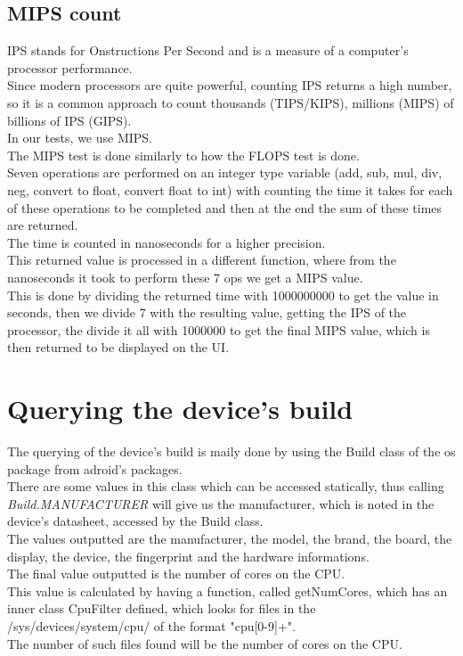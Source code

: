 \documentclass[a4paper,10pt]{report}
\begin{document}
 \subsection{MIPS count}
 IPS stands for Onstructions Per Second and is a measure of a computer's processor performance.\\
 Since modern processors are quite powerful, counting IPS returns a high number, so it is a common approach to count thousands (TIPS/KIPS), millions (MIPS) of billions of IPS (GIPS).\\
 In our tests, we use MIPS.\\
 The MIPS test is done similarly to how the FLOPS test is done. \\
 Seven operations are performed on an integer type variable (add, sub, mul, div, neg, convert to float, convert float to int) with counting the time it takes for each of these operations to be completed and then at the end the sum of these times are returned.\\
 The time is counted in nanoseconds for a higher precision.\\
 This returned value is processed in a different function, where from the nanoseconds it took to perform these 7 ops we get a MIPS value.\\
 This is done by dividing the returned time with 1000000000 to get the value in seconds, then we divide 7 with the resulting value, getting the IPS of the processor, the divide it all with 1000000 to get the final MIPS value, which is then returned to be displayed on the UI.\\
 
 \section{Querying the device's build}
 The querying of the device's build is maily done by using the Build class of the os package from adroid's packages.\\
 There are some values in this class which can be accessed statically, thus calling \textit{Build.MANUFACTURER} will give us the manufacturer, which is noted in the device's datasheet, accessed by the Build class.\\
 The values outputted are the manufacturer, the model, the brand, the board, the display, the device, the fingerprint and the hardware informations.\\
 The final value outputted is the number of cores on the CPU.\\
 This value is calculated by having a function, called getNumCores, which has an inner class CpuFilter defined, which looks for files in the /sys/devices/system/cpu/ of the format "cpu[0-9]+".\\
 The number of such files found will be the number of cores on the CPU.\\
 
\end{document}

